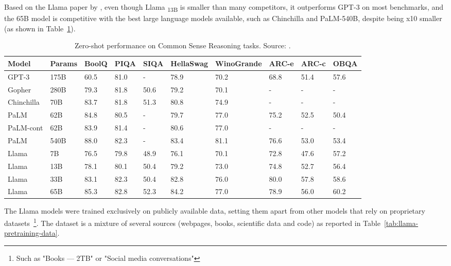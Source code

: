 Based on the Llama paper by \textcite{touvron2023llama}, even though Llama \textsubscript{13B} is smaller than many competitors, it outperforms GPT-3 on most benchmarks, and the 65B model is competitive with the best large language models available, such as Chinchilla and PaLM-540B, despite being x10 smaller (as shown in Table~\ref{tab:llama-zero-shot-performance}).

\begin{table}[htbp]
	\centering
	\scriptsize
	\begin{tabularx}{\textwidth}{@{}lXXXXXXXXX@{}}
		\toprule
		Model      & Params & BoolQ & PIQA & SIQA & HellaSwag & WinoGrande & ARC-e & ARC-c & OBQA \\
		\midrule
		GPT-3      & 175B   & 60.5  & 81.0 & -    & 78.9      & 70.2       & 68.8  & 51.4  & 57.6 \\
		Gopher     & 280B   & 79.3  & 81.8 & 50.6 & 79.2      & 70.1       & -     & -     & -    \\
		Chinchilla & 70B    & 83.7  & 81.8 & 51.3 & 80.8      & 74.9       & -     & -     & -    \\
		PaLM       & 62B    & 84.8  & 80.5 & -    & 79.7      & 77.0       & 75.2  & 52.5  & 50.4 \\
		PaLM-cont  & 62B    & 83.9  & 81.4 & -    & 80.6      & 77.0       & -     & -     & -    \\
		PaLM       & 540B   & 88.0  & 82.3 & -    & 83.4      & 81.1       & 76.6  & 53.0  & 53.4 \\
		\addlinespace
		Llama      & 7B     & 76.5  & 79.8 & 48.9 & 76.1      & 70.1       & 72.8  & 47.6  & 57.2 \\
		Llama      & 13B    & 78.1  & 80.1 & 50.4 & 79.2      & 73.0       & 74.8  & 52.7  & 56.4 \\
		Llama      & 33B    & 83.1  & 82.3 & 50.4 & 82.8      & 76.0       & 80.0  & 57.8  & 58.6 \\
		Llama      & 65B    & 85.3  & 82.8 & 52.3 & 84.2      & 77.0       & 78.9  & 56.0  & 60.2 \\
		\bottomrule
	\end{tabularx}
	\caption{Zero-shot performance on Common Sense Reasoning tasks. Source: \protect\textcite{touvron2023llama}.}
	\label{tab:llama-zero-shot-performance}
\end{table}

The Llama models were trained exclusively on publicly available data, setting them apart from other models that rely on proprietary datasets~\footnote{Such as "Books --- 2TB" or "Social media conversations"}.
The dataset is a mixture of several sources (webpages, books, scientific data and code) as reported in Table~\ref{tab:llama-pretraining-data}.

